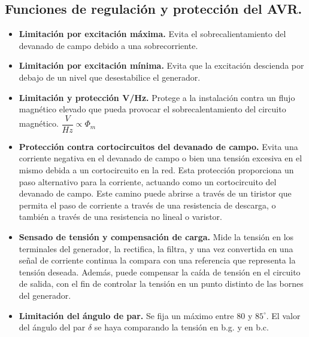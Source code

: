		\subsection{Funciones de regulación y protección del AVR.}
			\begin{itemize}
				\item \textbf{Limitación por excitación máxima.} Evita el sobrecalientamiento del devanado de campo debido a una sobrecorriente.
				\item \textbf{Limitación por excitación mínima.} Evita que la excitación descienda por debajo de un nivel que desestabilice el generador.
				\item \textbf{Limitación y protección V/Hz.} Protege a la instalación contra un flujo magnético elevado que pueda provocar el sobrecalentamiento del circuito magnético. $\dfrac{V}{Hz} \propto \Phi_m$
				\item \textbf{Protección contra cortocircuitos del devanado de campo.} Evita una corriente negativa en el devanado de campo o bien una tensión excesiva en el mismo debida a un cortocircuito en la red. Esta protección proporciona un paso alternativo para la corriente, actuando como un cortocircuito del devanado de campo. Este camino puede abrirse a través de un tiristor que permita el paso de corriente a través de una resistencia de descarga, o también a través de una resistencia no lineal o varistor.
				\item \textbf{Sensado de tensión y compensación de carga.} Mide la tensión en los terminales del generador, la rectifica, la filtra, y una vez convertida en una señal de corriente continua la compara con una referencia que representa la tensión deseada. Además, puede compensar la caída de tensión en el circuito de salida, con el fin de controlar la tensión en un punto distinto de las bornes del generador.
				\item \textbf{Limitación del ángulo de par.} Se fija un máximo entre $80$ y $85^\circ$. El valor del ángulo del par $\delta$ se haya comparando la tensión en b.g. y en b.c.
			\end{itemize}
			
